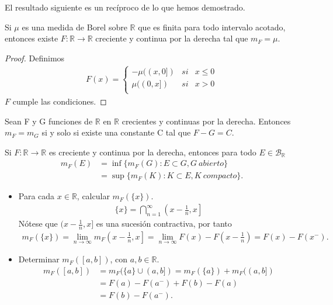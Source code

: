 \begin{itemize}
    El resultado siguiente es un recíproco de lo que hemos demostrado.
    \begin{teo}
    Si $\mu$ es una medida de Borel sobre $\mathbb{R}$ que es finita para todo intervalo acotado, entonces existe $F: \mathbb{R} \longrightarrow \mathbb{R}$ creciente y continua por la derecha tal que $m_F = \mu$.
    \end{teo}
    \begin{proof}
    Definimos
    \begin{align*}
        F(x) = \left\{ \begin{array}{lcc}
             -\mu((x,0]) &  si  & x \leq 0\\
             \mu((0,x]) &  si  & x > 0\\
             \end{array}
        \right. 
    \end{align*}
    $F$ cumple las condiciones.
    \end{proof}
\end{itemize}

\begin{prop}
Sean F y G funciones de $\mathbb{R}$ en $\mathbb{R}$ crecientes y continuas por la derecha. Entonces $m_F = m_G$ si y solo si existe una constante C tal que $F - G = C$.
\end{prop}

\begin{teo}
Si $F: \mathbb{R} \longrightarrow \mathbb{R}$ es creciente y continua por la derecha, entonces para todo 
$E \in \mathcal{B}_{\mathbb{R}}$
\begin{align*}
    m_F(E) &= \inf \{ m_F(G) : E \subset G, G \ abierto \}\\
    &= \sup \{ m_F(K) : K \subset E, K \ compacto \}.
\end{align*}
\end{teo}

\begin{ejemplo}
\begin{itemize}
    \item Para cada $x \in \mathbb{R}$, calcular $m_F(\{x\})$.
    \begin{align*}
        \{x\} = \bigcap_{n=1}^{\infty}\left( x - \frac{1}{n}, x \right]
    \end{align*}
    Nótese que $( x - \frac{1}{n}, x]$ es una sucesión contractiva, por tanto
    \begin{align*}
        m_F(\{x\}) = \lim_{n \to \infty}{m_F}\left( x - \frac{1}{n}, x \right] = \lim_{n \to \infty}{F(x) - F\left(x -\frac{1}{n}\right)} = F(x) - F(x^-).
    \end{align*}
    \item Determinar $m_F([a,b])$, con $a,b \in \mathbb{R}$.
    \begin{align*}
        m_F([a,b]) &= m_F(\{a\} \cup (a,b]) = m_F(\{a\}) + m_F((a,b])\\
        &= F(a) - F(a^-) + F(b) - F(a) \\
        &= F(b) - F(a^-).
    \end{align*}
\end{itemize}
\end{ejemplo}

